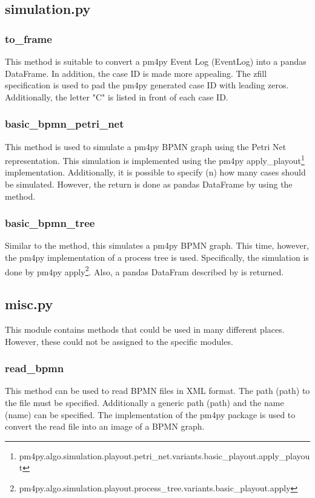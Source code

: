     \subsection{simulation.py}
    \subsubsection*{to\_frame}
    This method is suitable to convert a pm4py Event Log (EventLog) into a pandas DataFrame. In addition, the case ID is made more appealing. The zfill specification is used to pad the pm4py generated case ID with leading zeros. Additionally, the letter "C" is listed in front of each case ID.\label{toframe}
    \subsubsection*{basic\_bpmn\_petri\_net}
    This method is used to simulate a pm4py BPMN graph using the Petri Net representation. This simulation is implemented using the pm4py apply\_playout\footnote{pm4py.algo.simulation.playout.petri\_net.variants.basic\_playout.apply\_playout} implementation. Additionally, it is possible to specify (n) how many cases should be simulated. However, the return is done as pandas DataFrame by using the  method.\label{petri}
    \subsubsection*{basic\_bpmn\_tree}
    Similar to the  method, this simulates a pm4py BPMN graph. This time, however, the pm4py implementation of a process tree is used. Specifically, the simulation is done by pm4py apply\footnote{pm4py.algo.simulation.playout.process\_tree.variants.basic\_playout.apply}. Also, a pandas DataFram described by  is returned.\label{tree}

    \subsection{misc.py}
    This module contains methods that could be used in many different places. However, these could not be assigned to the specific modules.            
    \subsubsection*{read\_bpmn}
    This method can be used to read BPMN files in XML format. The path (path) to the file must be specified. Additionally a generic path (path) and the name (name) can be specified. The implementation of the pm4py package is used to convert the read file into an image of a BPMN graph.\label{readbpmn}
